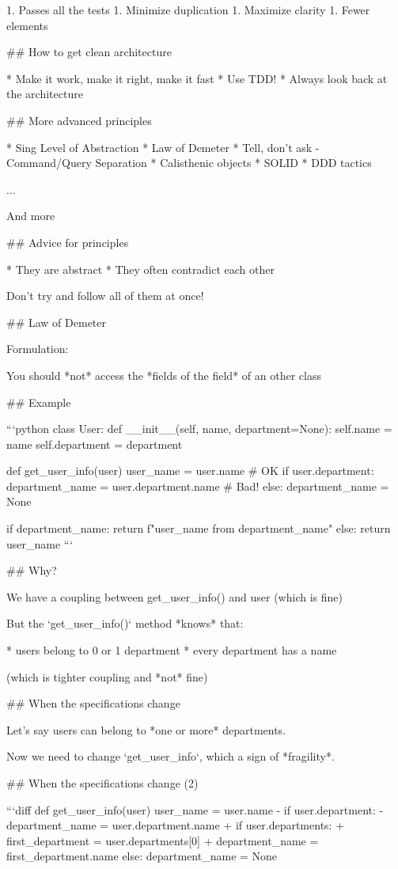 1. Passes all the tests
1. Minimize duplication
1. Maximize clarity
1. Fewer elements

## How to get clean architecture

* Make it work, make it right, make it fast
* Use TDD!
* Always look back at the architecture

## More advanced principles

* Sing Level of Abstraction
* Law of Demeter
* Tell, don't ask - Command/Query Separation
* Calisthenic objects
* SOLID
* DDD tactics

...

And more

## Advice for principles

* They are abstract
* They often contradict each other

Don't try and follow all of them at once!


## Law of Demeter

Formulation:

You should *not* access the *fields of the field* of an other class

## Example

```python
class User:
    def __init__(self, name, department=None):
        self.name = name
        self.department = department

def get_user_info(user)
    user_name = user.name  # OK
    if user.department:
        department_name = user.department.name  # Bad!
    else:
        department_name = None

    if department_name:
        return f"{user_name} from {department_name}"
    else:
        return user_name
```

## Why?

We have a coupling between get_user_info() and user (which is fine)

But the `get_user_info()` method *knows* that:

* users belong to 0 or 1 department
* every department has a name

(which is tighter coupling and *not* fine)


## When the specifications change

Let's say users can belong to *one or more* departments.

Now we need to change `get_user_info`, which a sign of *fragility*.

## When the specifications change (2)

```diff
def get_user_info(user)
    user_name = user.name
-    if user.department:
-       department_name = user.department.name
+    if user.departments:
+       first_department = user.departments[0]
+       department_name = first_department.name
    else:
        department_name = None

